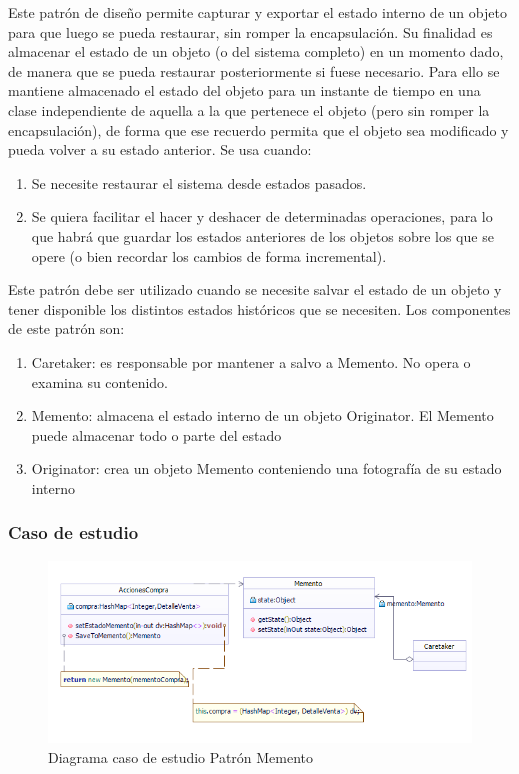 Este patrón de diseño permite capturar y exportar el estado interno de un objeto para que luego se pueda restaurar, sin romper la encapsulación.
Su finalidad es almacenar el estado de un objeto (o del sistema completo) en un momento dado, de manera que se pueda restaurar posteriormente si fuese necesario. Para ello se mantiene almacenado el estado del objeto para un instante de tiempo en una clase independiente de aquella a la que pertenece el objeto (pero sin romper la encapsulación), de forma que ese recuerdo permita que el objeto sea modificado y pueda volver a su estado anterior.
\newline
Se usa cuando:
\begin{enumerate}
	\item Se necesite restaurar el sistema desde estados pasados.
	\item Se quiera facilitar el hacer y deshacer de determinadas operaciones, para lo que habrá que guardar los estados anteriores de los objetos sobre los que se opere (o bien recordar los cambios de forma incremental).
\end{enumerate}
Este patrón debe ser utilizado cuando se necesite salvar el estado de un objeto y tener disponible los distintos estados históricos que se necesiten.
\newline
Los componentes de este patrón son:
\begin{enumerate}
	\item Caretaker: es responsable por mantener a salvo a Memento. No opera o examina su contenido.
	\item Memento: almacena el estado interno de un objeto Originator. El Memento puede almacenar todo o parte del estado
	\item Originator: crea un objeto Memento conteniendo una fotografía de su estado interno
\end{enumerate}

\subsubsection{Caso de estudio}
\begin{figure}[h!]
	\centering
	\includegraphics[width=0.7\linewidth]{arquitectura/imagenes/PatronMementoCasoEstudio}
	\caption{Diagrama caso de estudio Patrón Memento}
	\label{fig:Caso de estudio Patrón Memento}
\end{figure}

